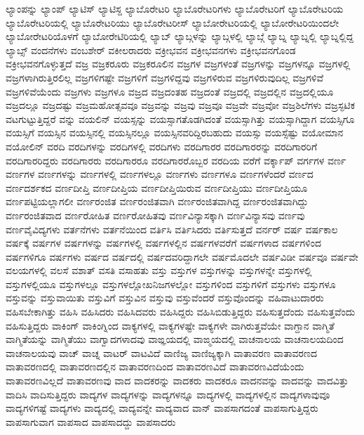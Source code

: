 {ಲ್ಯಾಂಪನ್ನು
ಲ್ಯಾಂಪ್
ಲ್ಯಾಟಿಸ್
ಲ್ಯಾಟಿಸ್ದ
ಲ್ಯಾಬೊರೇಟರಿ
ಲ್ಯಾಬೊರೇಟರಿಗಳು
ಲ್ಯಾಬೊರೇಟರಿಗೆ
ಲ್ಯಾಬೊರೇಟರಿಯ
ಲ್ಯಾಬೊರೇಟರಿಯಲ್ಲಿ
ಲ್ಯಾಬೊರೇಟರಿಯು
ಲ್ಯಾಬೊರೇಟರೀಸ್
ಲ್ಯಾಬೋರೇಟರಿಯಲ್ಲಿ
ಲ್ಯಾಬೋರೇಟರಿಯಿಂದಲೇ
ಲ್ಯಾಬೋರೇಟರಿಯೊಳಗೆ
ಲ್ಯಾಬೋರೇಟಿರಿಯಲ್ಲಿ
ಲ್ಯಾಬ್
ಲ್ಯಾಬ್ಗಳನ್ನು
ಲ್ಯಾಬ್ಗಳಲ್ಲಿ
ಲ್ಯಾಬ್ಗೆ
ಲ್ಯಾಬ್ನ
ಲ್ಯಾಬ್ನಲ್ಲಿ
ಲ್ಯಾಬ್ನಲ್ಲಿದ್ದ
ಲ್ಯಾಬ್ಸ್
ವಂದನೆಗಳು
ವಂಬಶೇರ್
ವಕೀಲರಾದರು
ವಕ್ರೀಭವನ
ವಕ್ರೀಭವನಗಳು
ವಕ್ರೀಭವನಗೊಂಡ
ವಕ್ರೀಭವನಗೊಳ್ಳುತ್ತದೆ
ವಜ್ರ
ವಜ್ರಕರೂರು
ವಜ್ರಕರೂಲಿನ
ವಜ್ರಗಳ
ವಜ್ರಗಳಂತೆ
ವಜ್ರಗಳನ್ನು
ವಜ್ರಗಳನ್ನೂ
ವಜ್ರಗಳಲ್ಲಿ
ವಜ್ರಗಳಾಗಿರುತ್ತಿರಲಿಲ್ಲ
ವಜ್ರಗಳಿಗಷ್ಟೇ
ವಜ್ರಗಳಿಗೆ
ವಜ್ರಗಳಿದ್ದವು
ವಜ್ರಗಳಿರುವ
ವಜ್ರಗಳಿರುವುದಿಲ್ಲ
ವಜ್ರಗಳಿವೆ
ವಜ್ರಗಳಿವೆಯೆಂದು
ವಜ್ರಗಳು
ವಜ್ರಗಳೂ
ವಜ್ರದ
ವಜ್ರದಂತಹ
ವಜ್ರದಂತೆ
ವಜ್ರದಲ್ಲಿ
ವಜ್ರದಲ್ಲಿನ
ವಜ್ರದಲ್ಲಿಯೂ
ವಜ್ರದಲ್ಲೂ
ವಜ್ರದಷ್ಟು
ವಜ್ರಮಹೋತ್ಸವವೂ
ವಜ್ರವನ್ನು
ವಜ್ರವು
ವಜ್ರವೂ
ವಜ್ರವೇ
ವಜ್ರವೋ
ವಜ್ರಶಿಲೆಗಳು
ವಜ್ರಸ್ಫಟಿಕ
ವಟಗುಟ್ಟುತ್ತಿದ್ದರೆ
ವನ್ನು
ವಯಲಿನ್
ವಯಸ್ಸನ್ನು
ವಯಸ್ಸಾಗತೊಡಗಿದಂತೆ
ವಯಸ್ಸಾಗಿತ್ತು
ವಯಸ್ಸಾಗಿದ್ದಾಗ
ವಯಸ್ಸಿಗೂ
ವಯಸ್ಸಿಗೆ
ವಯಸ್ಸಿನ
ವಯಸ್ಸಿನಲ್ಲಿ
ವಯಸ್ಸಿನಲ್ಲೂ
ವಯಸ್ಸಿನವರಿದ್ದಿರಬಹುದು
ವಯಸ್ಸು
ವಯಸ್ಸೆಷ್ಟು
ವಯೋಮಾನ
ವಯೋಲಿನ್
ವರದಿ
ವರದಿಗಳನ್ನು
ವರದಿಗಳಲ್ಲಿ
ವರದಿಗಳು
ವರದಿಗಾರರ
ವರದಿಗಾರರನ್ನು
ವರದಿಗಾರರಿಗೆ
ವರದಿಗಾರರಿದ್ದರು
ವರದಿಗಾರರು
ವರದಿಗಾರರೂ
ವರದಿಗಾರರೊಬ್ಬರ
ವರದಿಯ
ವರೆಗೆ
ವರ್ಕ್ಶಾಪ್
ವರ್ಗಗಳ
ವರ್ಣ
ವರ್ಣಗಳ
ವರ್ಣಗಳನ್ನು
ವರ್ಣಗಳಲ್ಲಿ
ವರ್ಣಗಳಲ್ಲೂ
ವರ್ಣಗಳು
ವರ್ಣಗಳೂ
ವರ್ಣಗಳೆಂದರೆ
ವರ್ಣದ
ವರ್ಣದರ್ಶಕದ
ವರ್ಣದೀಪ್ತಿ
ವರ್ಣದೀಪ್ತಿಯ
ವರ್ಣದೀಪ್ತಿಯಿರುವ
ವರ್ಣದೀಪ್ತಿಯು
ವರ್ಣದೀಪ್ತಿಯೂ
ವರ್ಣಪಟ್ಟಿಯಲ್ಲಾಗಲೀ
ವರ್ಣರಂಜಿತ
ವರ್ಣರಂಜಿತವಾಗಿ
ವರ್ಣರಂಜಿತವಾಗಿದ್ದ
ವರ್ಣರಂಜಿತವಾಗಿದ್ದು
ವರ್ಣರಂಜಿತವಾದ
ವರ್ಣರೋಹಿತ
ವರ್ಣರೋಹಿತವು
ವರ್ಣವಿನ್ಯಾಸಕ್ಕಾಗಿ
ವರ್ಣವಿನ್ಯಾಸವು
ವರ್ಣವು
ವರ್ಣವೈವಿದ್ಯಗಳು
ವರ್ತನೆಗಳು
ವರ್ತನೆಯಿಂದ
ವರ್ತಿಸಿ
ವರ್ತಿಸಿದರು
ವರ್ತಿಸುತ್ತದೆ
ವರ್ನರ್
ವರ್ಷ
ವರ್ಷಕಾಲ
ವರ್ಷಕ್ಕೆ
ವರ್ಷಗಳ
ವರ್ಷಗಳನ್ನು
ವರ್ಷಗಳಲ್ಲಿ
ವರ್ಷಗಳಲ್ಲಿನ
ವರ್ಷಗಳವರೆಗೆ
ವರ್ಷಗಳಾದ
ವರ್ಷಗಳಿಂದ
ವರ್ಷಗಳಿಗೂ
ವರ್ಷಗಳು
ವರ್ಷದ
ವರ್ಷದಲ್ಲಿ
ವರ್ಷದವರಿದ್ದಾಗಲೇ
ವರ್ಷಮೊದಲೇ
ವರ್ಷವಿಡೀ
ವರ್ಷವೂ
ವರ್ಷವೇ
ವಲಯಗಳಲ್ಲಿ
ವಲಸೆ
ವಶಾತ್
ವಸತಿ
ವಸಾಹತು
ವಸ್ತು
ವಸ್ತುಗಳ
ವಸ್ತುಗಳನ್ನು
ವಸ್ತುಗಳನ್ನೇ
ವಸ್ತುಗಳಲ್ಲಿ
ವಸ್ತುಗಳಲ್ಲಿಯೂ
ವಸ್ತುಗಳಲ್ಲೂ
ವಸ್ತುಗಳಲ್ಲೋಖನಿಜಗಳಲ್ಲೋ
ವಸ್ತುಗಳಿಂದ
ವಸ್ತುಗಳಿಗೆ
ವಸ್ತುಗಳು
ವಸ್ತುಗಳೂ
ವಸ್ತುವನ್ನು
ವಸ್ತುವಾಯಿತು
ವಸ್ತುವಿಗೆ
ವಸ್ತುವಿನ
ವಸ್ತುವು
ವಸ್ತುವೆಂದರೆ
ವಸ್ತುವೊಂದನ್ನು
ವಹಿವಾಟುದಾರರು
ವಹಿಸಬೇಕಾಗಿತ್ತು
ವಹಿಸಿ
ವಹಿಸಿದರು
ವಹಿಸಿದವರು
ವಹಿಸಿದ್ದರು
ವಹಿಸಿಬಿಡುತ್ತಿದ್ದರು
ವಹಿಸುತ್ತದೆಂದು
ವಹಿಸುತ್ತವೆಂದು
ವಹಿಸುತ್ತಿದ್ದರು
ವಾಕಿಂಗ್
ವಾಕಿಂಗ್ನಿಂದ
ವಾಕ್ಯಗಳಲ್ಲಿ
ವಾಕ್ಯಗಳಷ್ಟೇ
ವಾಕ್ಯಗಳೇ
ವಾಗಿರುತ್ತವೆಯೇ
ವಾಗ್ದಾನ
ವಾಗ್ಮಿತೆ
ವಾಗ್ಮಿತೆಯನ್ನು
ವಾಗ್ಮಿತೆಯು
ವಾಗ್ವಾದಗಳಾದವು
ವಾಙ್ಞಯದಲ್ಲಿ
ವಾಙ್ಮಯದಲ್ಲಿ
ವಾಚನಾಲಯ
ವಾಚನಾಲಯದಿಂದ
ವಾಚನಾಲಯವು
ವಾಚ್
ವಾಚ್ನ
ವಾಟರ್
ವಾಟವಿದೆ
ವಾಣಿಜ್ಯ
ವಾಣಿಜ್ಯಕ್ಕಾಗಿ
ವಾತಾವರಣ
ವಾತಾವರಣದ
ವಾತಾವರಣದಲ್ಲಿ
ವಾತಾವರಣದಲ್ಲಿನ
ವಾತಾವರಣದಿಂದ
ವಾತಾವರಣವಿದೆ
ವಾತಾವರಣವಿದೆಯೆಂದು
ವಾತಾವರಣವಿಲ್ಲದೆ
ವಾತಾವರಣವು
ವಾದ
ವಾದಕರನ್ನು
ವಾದಕರು
ವಾದಕರೂ
ವಾದನವನ್ನು
ವಾದವನ್ನು
ವಾದವಿತ್ತು
ವಾದಿಸಿ
ವಾದಿಸುತ್ತಿದ್ದರು
ವಾದ್ಯಗಳ
ವಾದ್ಯಗಳನ್ನು
ವಾದ್ಯಗಳನ್ನೂ
ವಾದ್ಯಗಳಲ್ಲಿ
ವಾದ್ಯಗಳಲ್ಲಿನ
ವಾದ್ಯಗಳಾವುವೂ
ವಾದ್ಯಗಳಿಗಷ್ಟೆ
ವಾದ್ಯಗಳು
ವಾದ್ಯದಲ್ಲಿ
ವಾದ್ಯವನ್ನೇ
ವಾದ್ಯವಾದ
ವಾನ್
ವಾಪಸಾಗದಂತೆ
ವಾಪಸಾಗುತ್ತಿದ್ದರು
ವಾಪಸಾಗುವಾಗ
ವಾಪಸಾದ
ವಾಪಸಾದದ್ದು
ವಾಪಸಾದರು
}
